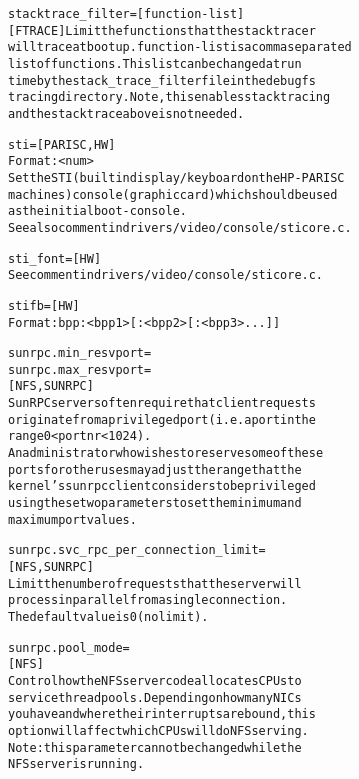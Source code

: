 \documentclass[a4paper,8pt,english]{sphinxmanual}
\begin{document}
\begin{alltt}
        stacktrace\_filter={[}function-list{]}
                        {[}FTRACE{]} Limit the functions that the stack tracer
                        will trace at boot up. function-list is a comma separated
                        list of functions. This list can be changed at run
                        time by the stack\_trace\_filter file in the debugfs
                        tracing directory. Note, this enables stack tracing
                        and the stacktrace above is not needed.

        sti=            {[}PARISC,HW{]}
                        Format: \textless{}num\textgreater{}
                        Set the STI (builtin display/keyboard on the HP-PARISC
                        machines) console (graphic card) which should be used
                        as the initial boot-console.
                        See also comment in drivers/video/console/sticore.c.

        sti\_font=       {[}HW{]}
                        See comment in drivers/video/console/sticore.c.

        stifb=          {[}HW{]}
                        Format: bpp:\textless{}bpp1\textgreater{}{[}:\textless{}bpp2\textgreater{}{[}:\textless{}bpp3\textgreater{}...{]}{]}

        sunrpc.min\_resvport=
        sunrpc.max\_resvport=
                        {[}NFS,SUNRPC{]}
                        SunRPC servers often require that client requests
                        originate from a privileged port (i.e. a port in the
                        range 0 \textless{} portnr \textless{} 1024).
                        An administrator who wishes to reserve some of these
                        ports for other uses may adjust the range that the
                        kernel's sunrpc client considers to be privileged
                        using these two parameters to set the minimum and
                        maximum port values.

        sunrpc.svc\_rpc\_per\_connection\_limit=
                        {[}NFS,SUNRPC{]}
                        Limit the number of requests that the server will
                        process in parallel from a single connection.
                        The default value is 0 (no limit).

        sunrpc.pool\_mode=
                        {[}NFS{]}
                        Control how the NFS server code allocates CPUs to
                        service thread pools.  Depending on how many NICs
                        you have and where their interrupts are bound, this
                        option will affect which CPUs will do NFS serving.
                        Note: this parameter cannot be changed while the
                        NFS server is running.


\end{alltt}
\end{document}
